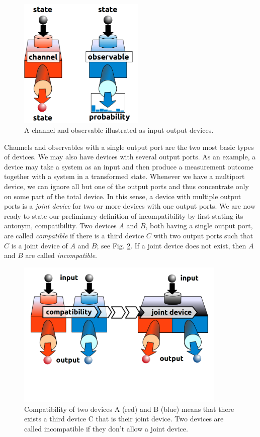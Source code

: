 \documentclass[12pt]{iopart}
\theoremstyle{definition}
\begin{document}
\begin{figure}\begin{center}
\includegraphics[width=6cm]{fig_devices.png}
\caption{A channel and observable illustrated as input-output devices.}
\label{fig:basic}
\end{center}
\end{figure}

Channels and observables with a single output port are the two most basic types of devices.
We may also have devices with several output ports.
As an example, a device may take a system as an input and then produce a measurement outcome together with a system in a transformed state. 
Whenever we have a multiport device, we can ignore all but one of the output ports and thus concentrate only on some part of the total device.
In this sense, a device with multiple output ports is a \emph{joint device} for two or more devices with one output ports.
We are now ready to state our preliminary definition of incompatibility by first stating its antonym, compatibility.
Two devices $A$ and $B$, both having a single output port, are called \emph{compatible} if there is a third device $C$ with two output ports such that $C$ is a joint device of $A$ and $B$; see Fig. \ref{fig:existence}.
If a joint device does not exist, then $A$ and $B$ are called \emph{incompatible}.

\begin{figure}\begin{center}
\includegraphics[width=10cm]{fig_incom.png}
\caption{Compatibility of two devices A (red) and B (blue) means that there exists a third device C that is their joint device.
Two devices are called incompatible if they don't allow a joint device.}
\label{fig:existence}
\end{center}
\end{figure}
\end{document}

